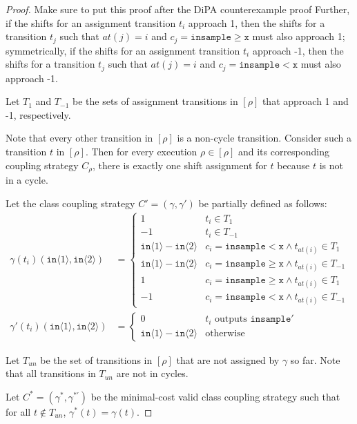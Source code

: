 \documentclass[12pt]{article}
\newcommand{\gguard}[1][x]{\texttt{insample}\geq #1}
\newcommand{\lguard}[1][x]{\texttt{insample} < #1}
\newcommand{\brangle}[1]{\langle #1 \rangle}
\theoremstyle{definition}
\begin{document}
\begin{proof}{\color{red} Make sure to put this proof after the DiPA counterexample proof}
    Further, if the shifts for an assignment transition $t_i$ approach 1, then the shifts for a transition $t_j$ such that $at(j) = i$ and $c_j = \gguard[\texttt{x}]$ must also approach 1; symmetrically, if the shifts for an assignment transition $t_i$ approach -1, then the shifts for a transition $t_j$ such that $at(j) = i$ and $c_j = \lguard[\texttt{x}]$ must also approach -1. 

    Let $T_1$ and $T_{-1}$ be the sets of assignment transitions in $[\rho]$ that approach 1 and -1, respectively. 

    Note that every other transition in $[\rho]$ is a non-cycle transition. Consider such a transition $t$ in $[\rho]$. Then for every execution $\rho\in [\rho]$ and its corresponding coupling strategy $C_\rho$, there is exactly one shift assignment for $t$ because $t$ is not in a cycle. 

    Let the class coupling strategy $C' = (\gamma, \gamma')$ be partially defined as follows: \begin{align*}
        \gamma(t_i)(\texttt{in}\brangle{1}, \texttt{in}\brangle{2}) &= \begin{cases}
            1 & t_i \in T_1\\
            -1 & t_i \in T_{-1}\\
            \texttt{in}\brangle{1}-\texttt{in}\brangle{2} & c_i = \lguard[\texttt{x}]\land t_{at(i)}\in T_1\\
            \texttt{in}\brangle{1}-\texttt{in}\brangle{2} & c_i = \gguard[\texttt{x}]\land t_{at(i)}\in T_{-1}\\
            1 & c_i = \gguard[\texttt{x}]\land t_{at(i)}\in T_1\\
            -1 & c_i = \lguard[\texttt{x}]\land t_{at(i)}\in T_{-1}
        \end{cases}\\
        \gamma'(t_i)(\texttt{in}\brangle{1}, \texttt{in}\brangle{2}) &=\begin{cases}
            0 & t_i\text{ outputs }\texttt{insample}'\\
            \texttt{in}\brangle{1}-\texttt{in}\brangle{2} & \text{otherwise}
        \end{cases}
    \end{align*}

    Let $T_{un}$ be the set of transitions in $[\rho]$ that are not assigned by $\gamma$ so far. Note that all transitions in $T_{un}$ are not in cycles. 

    Let $C^* = (\gamma^*, \gamma^{*\prime})$ be the minimal-cost valid class coupling strategy such that for all $t\notin T_{un}$, $\gamma^*(t) = \gamma(t)$. 


\end{proof}
\end{document}
